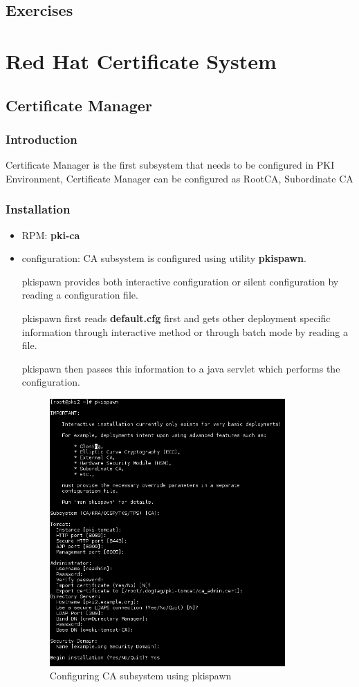 \documentclass[a4paper]{article}
\begin{document}
\subsection{Exercises}
\section{Red Hat Certificate System}
\subsection{Certificate Manager}
\subsubsection{Introduction}
Certificate Manager is the first subsystem that needs to be configured in PKI Environment, Certificate Manager can be configured as RootCA, Subordinate CA
\subsubsection{Installation}
    \begin{itemize}
        \item RPM: \textrm{\textbf{pki-ca}}
        \item configuration:  CA subsystem is configured using utility \textbf{pkispawn}. 
            
            pkispawn provides both interactive configuration  or silent configuration by reading a configuration file. 
            
            pkispawn first reads \textbf{default.cfg} first and gets other deployment specific information through interactive method
            or through batch mode by reading a file. 

            pkispawn then passes this information to a java servlet which performs the configuration. 
        \begin{figure}[ht!]
            \centering
            \includegraphics[width=90mm]{pkispawn-ca.png}
            \caption{Configuring CA subsystem using pkispawn}
        \end{figure}
    \end{itemize}
\end{document}
